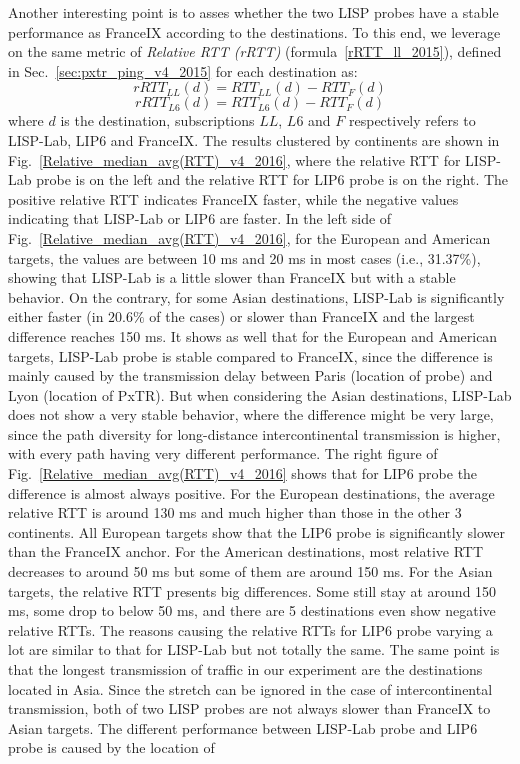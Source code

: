 Another interesting point is to asses whether the two LISP probes have a stable performance as FranceIX according to the destinations. To this end, we leverage on the same metric of \emph{Relative RTT (rRTT)} (formula~\ref{rRTT_ll_2015}), defined in Sec.~\ref{sec:pxtr_ping_v4_2015} for each destination as: 
\begin{equation} 
    \label{rRTT_ll_2016}
    rRTT_{LL}(d)=RTT_{LL}(d) - RTT_{F}(d)
\end{equation}
\begin{equation}
    \label{rRTT_l6_2016}
    rRTT_{L6}(d) = RTT_{L6}(d) - RTT_{F}(d)
\end{equation}
where $d$ is the destination, subscriptions $LL$, $L6$ and $F$ respectively refers to LISP-Lab, LIP6 and FranceIX. The results clustered by continents are shown in Fig.~\ref{Relative_median_avg(RTT)_v4_2016}, where the relative RTT for LISP-Lab probe is on the left and the relative RTT for LIP6 probe is on the right. The positive relative RTT indicates FranceIX faster, while the negative values indicating that LISP-Lab or LIP6 are faster. In the left side of Fig.~\ref{Relative_median_avg(RTT)_v4_2016}, for the European and American targets, the values are between 10 ms and 20 ms in most cases (i.e., 31.37\%), showing that LISP-Lab is a little slower than FranceIX but with a stable behavior. On the contrary, for some Asian destinations, LISP-Lab is significantly either faster (in $20.6\%$ of the cases) or slower than FranceIX and the largest difference reaches 150 ms. It shows as well that for the European and American targets, LISP-Lab probe is stable compared to FranceIX, since the difference is mainly caused by the transmission delay between Paris (location of probe) and Lyon (location of PxTR). But when considering the Asian destinations, LISP-Lab does not show a very stable behavior, where the difference might be very large, since the path diversity for long-distance intercontinental transmission is higher, with every path having very different performance. The right figure of Fig.~\ref{Relative_median_avg(RTT)_v4_2016} shows that for LIP6 probe the difference is almost always positive. For the European destinations, the average relative RTT is around 130 ms and much higher than those in the other 3 continents. All European targets show that the LIP6 probe is significantly slower than the FranceIX anchor. For the American destinations, most relative RTT decreases to around 50 ms but some of them are around 150 ms. For the Asian targets, the relative RTT presents big differences. Some still stay at around 150 ms, some drop to below 50 ms, and there are 5 destinations even show negative relative RTTs. The reasons causing the relative RTTs for LIP6 probe varying a lot are similar to that for LISP-Lab but not totally the same. The same point is that the longest transmission of traffic in our experiment are the destinations located in Asia. Since the stretch can be ignored in the case of intercontinental transmission, both of two LISP probes are not always slower than FranceIX to Asian targets. The different performance between LISP-Lab probe and LIP6 probe is caused by the location of 